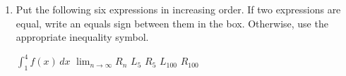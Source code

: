\documentclass{article}
\begin{document}
\begin{enumerate}
\begin{enumerate}
\begin{enumerate}
    \item 
    \begin{problem}
        Write down the value of $\Delta x$.
    \end{problem}
    \pspace{\vfill}

    \begin{solution}
        $\Delta x = \dfrac{4-1}{5}= \dfrac{3}{5}$
    \end{solution}

        \item 
    \begin{problem}
        Write down a formula for $x_k$ in terms of $k$.
    \end{problem}
    \pspace{\vfill}

    \begin{solution}
        $x_k = 1+k\Delta x = 1+ \frac{3}{5}k$
    \end{solution}

\item 
\begin{problem}
    Write down a formula for $R_5$ \textbf{using sigma notation. }
\end{problem}
\pspace{\vfill}

\begin{solution}
    $\displaystyle R_5 = \sum_{k=1}^5 \tfrac{3}{5}f(1+\tfrac{3}{5}k)$
\end{solution}

\end{enumerate}


\item Put the following six expressions in increasing order. If
two expressions are equal, write an equals sign between them in the box. Otherwise, use the appropriate inequality symbol.

\hfill $\displaystyle\int_1^4 f(x)\, dx$ \hfill 
$\displaystyle\lim_{n\to \infty} R_n$ \hfill
$L_5$ \hfill
$R_5$ \hfill
$L_{100}$ \hfill
$R_{100}$ \hfill\strut

\pspace{\vfill}



\end{enumerate}
\end{enumerate}
\end{document}
